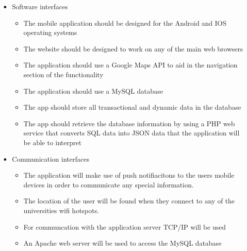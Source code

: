\documentclass{article}
\begin{document}
\begin{itemize}
			\item Software interfaces
				\begin{itemize}
					\item The mobile application should be designed for the Android and IOS operating systems
					\item The website should be designed to work on any of the main web browsers
					\item The application should use a Google Maps API to aid in the navigation section of the functionality
					\item The application should use a MySQL database
					\item The app should store all transactional and dynamic data in the database
					\item The app should retrieve the database information by using a PHP web service that converts SQL data into JSON data that the application will be able to interpret
				\end{itemize}
				
			\item Communication interfaces
		\begin{itemize}
		\item The application will make use of push notifiacitons to the users mobile devices in order to communicate any special information. 

        \item The location of the user will be found when they connect to any of the universities wifi hotspots.

		\item For communcation with the application server TCP/IP will be used

		\item An Apache web server will be used to access the MySQL database
		\end{itemize}
			\end{itemize}
		
\end{document}
